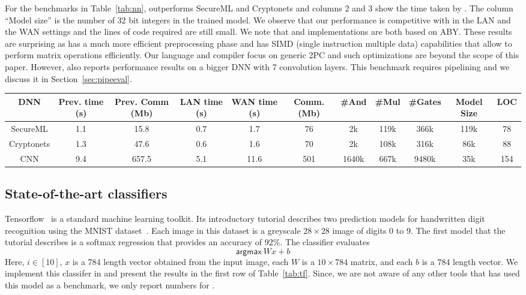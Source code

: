 For the benchmarks in Table~\ref{tab:nn}, \minion
outperforms SecureML and Cryptonets and columns 2 and 3 show the time taken by \minion. 
The column ``Model size'' is the number of 32 bit integers in the trained model.
We observe that our performance is competitive with \minion in the LAN
and the WAN settings and the lines of code required are still small. 
We note that \minion and \tool implementations are both based on ABY.
These results are surprising as \minion has a much more efficient
preprocessing phase and has SIMD 
(single instruction multiple data) capabilities that allow \minion to perform
matrix operations efficiently. Our language and compiler 
focus on generic 2PC and such optimizations are beyond the scope of this paper.
However, \minion also reports performance results on a bigger DNN with
7 convolution layers. 
This benchmark requires pipelining and we discuss it in Section~\ref{sec:pipeeval}.

\begin{table*}
\begin{tabular}{c|c|c|c |c|c|c|c|c|c|c}
DNN  & Prev. time (s) & Prev. Comm (Mb) & LAN time (s) & WAN time (s) & Comm. (Mb)  & \#And & \#Mul & \#Gates & Model Size & LOC\\
\hline
SecureML   &  1.1 & 15.8 & 0.7 & 1.7  & 76   &  2k   & 119k & 366k   & 119k & 78\\
\hline
Cryptonets &  1.3 & 47.6 & 0.6 & 1.6  & 70    & 2k    & 108k & 316k & 86k & 88\\
\hline
CNN        &  9.4 & 657.5& 5.1 & 11.6 & 501  & 1640k & 667k & 9480k & 35k & 154\\
\hline
\end{tabular}

 \caption{DNN benchmarks. We compare our results (columns 4 , 5, 6) with~\cite{minionn} (columns 2 and 3)}
 \label{tab:nn} 
\end{table*}


\subsection{State-of-the-art classifiers}
Tensorflow~\cite{tensorflow} is a standard machine learning toolkit.
Its introductory tutorial describes two prediction models for handwritten digit recognition
using the MNIST dataset~\cite{mnist}.
Each image in this dataset is a greyscale $28\times 28$ image of
digits 0 to 9.
The first model that the tutorial describes is a softmax regression
that provides an accuracy of 92\%. The classifier evaluates
\[
 \mathsf{argmax}\ Wx+b
\]
Here, $i\in [10]$, $x$ is a 784 length vector obtained from the input image,
each $W$ is a $10\times 784$ matrix, and each $b$ is a $784$ length
vector. 
We implement this classifer in \tool and present the results in the
first row of Table~\ref{tab:tf}.
Since, we are not aware of any other tools that has used this
model as a benchmark, we only report numbers for \tool.


